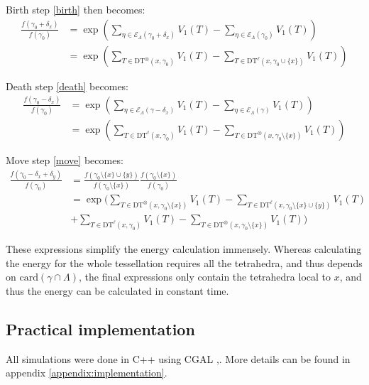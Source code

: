 Birth step \ref{birth} then becomes:
\begin{align*}
\frac{f(\gamma_0 + \delta_x)}{f(\gamma_0)} &= \exp\left({\sum_{\eta\in \mathcal E_\Lambda(\gamma_0 + \delta_x)} V_1(T) - \sum_{\eta\in \mathcal E_\Lambda(\gamma_0)}V_1(T)}\right) \\
&= \exp\left(  \sum_{T \in \text{DT}^\otimes (x,\gamma_0)} V_1(T)  - \sum_{T\in \text{DT}^\ell (x,\gamma_0\cup\{x\})} V_1(T) \right)  
\end{align*}

Death step \ref{death} becomes:
\begin{align*}
\frac{f(\gamma_0 - \delta_x)}{f(\gamma_0)}&= \exp\left({\sum_{\eta\in \mathcal E_\Lambda(\gamma - \delta_x)} V_1(T)- \sum_{\eta\in \mathcal E_\Lambda(\gamma)}V_1(T)}\right)\\
&= \exp\left( \sum_{T\in \text{DT}^\ell (x,\gamma_0)} V_1(T) - \sum_{T \in \text{DT}^\otimes (x,\gamma_0 \setminus \{x\})} V_1(T)   \right)
\end{align*}

Move step \ref{move} becomes:
\begin{align*}
\frac{f(\gamma_0 - \delta_x + \delta_y)}{f(\gamma_0)}&= 
\frac{f(\gamma_0 \setminus \{x\} \cup \{y\})}{f(\gamma_0\setminus\{x\})} \frac{f(\gamma_0\setminus\{x\})}{f(\gamma_0)} \\ 
&= \exp \Bigg(  \sum_{T \in \text{DT}^\otimes (x,\gamma_0\setminus\{x\})} V_1(T)  - \sum_{T\in \text{DT}^\ell (x,\gamma_0\setminus\{x\}\cup\{y\})} V_1(T)  \\
&+ \sum_{T\in \text{DT}^\ell (x,\gamma_0)} V_1(T) - \sum_{T \in \text{DT}^\otimes (x,\gamma_0\setminus\{x\})} V_1(T)   
\Bigg)
\end{align*}



These expressions simplify the energy calculation immensely. Whereas calculating the energy for the whole tessellation requires all the tetrahedra, and thus depends on $\text{card}(\gamma\cap\Lambda)$, the final expressions only contain the tetrahedra local to $x$, and thus the energy can be calculated in constant time.


\subsection{Practical implementation}
All simulations were done in C++ using CGAL \cite{cgal},\cite{cgal:3d-triang}. More details can be found in appendix \ref{appendix:implementation}.
